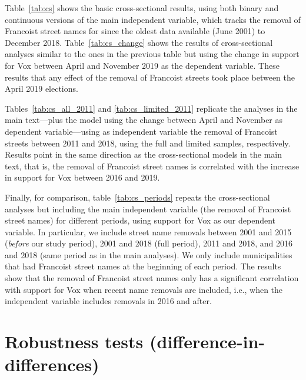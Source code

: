 \documentclass[12pt, titlepage]{article}
\begin{document}
Table~\ref{tab:cs} shows the basic cross-sectional results, using both binary and continuous versions of the main independent variable, which tracks the removal of Francoist street names for since the oldest data available (June 2001) to December 2018.
Table~\ref{tab:cs_change} shows the results of cross-sectional analyses similar to the ones in the previous table but using the change in support for Vox between April and November 2019 as the dependent variable.
These results that any effect of the removal of Francoist streets took place between the April 2019 elections.





Tables~\ref{tab:cs_all_2011} and \ref{tab:cs_limited_2011} replicate the analyses in the main text---plus the model using the change between April and November as dependent variable---using as independent variable the removal of Francoist streets between 2011 and 2018, using the full and limited samples, respectively.
Results point in the same direction as the cross-sectional models in the main text, that is, the removal of Francoist street names is correlated with the increase in support for Vox between 2016 and 2019.




Finally, for comparison, table~\ref{tab:cs_periods} repeats the cross-sectional analyses but including the main independent variable (the removal of Francoist street names) for different periods, using support for Vox as our dependent variable.
In particular, we include street name removals between 2001 and 2015 (\textit{before} our study period), 2001 and 2018 (full period), 2011 and 2018, and 2016 and 2018 (same period as in the main analyses).
We only include municipalities that had Francoist street names at the beginning of each period.
The results show that the removal of Francoist street names only has a significant correlation with support for Vox when recent name removals are included, i.e., when the independent variable includes removals in 2016 and after.



\clearpage
\section{Robustness tests (difference-in-differences)}\label{app:robustness_did}
\end{document}
